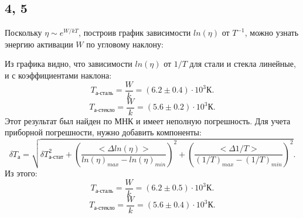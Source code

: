 \subsection*{4, 5}
Поскольку $\eta \sim e^{W/kT}$, построив график зависимости $ln(\eta)$ от $T^{-1}$, можно узнать энергию активации $W$ по угловому наклону:

Из графика видно, что зависимости $ln(\eta)$ от $1/T$ для стали и стекла линейные, и с коэффициентами наклона:
$$T_\text{а-сталь} = \frac{W}{k} = (6.2 \pm 0.4) \cdot 10^3 \text{К}.$$
$$T_\text{а-стекло} = \frac{W}{k} = (5.6 \pm 0.2) \cdot 10^3 \text{К}.$$
Этот результат был найден по МНК и имеет неполную погрешность. Для учета приборной погрешности, нужно добавить компоненты:
$$\delta T_\text{а} = \sqrt{\delta T_\text{а-стат}^2 + \left(\frac{<\Delta ln(\eta)>}{ln(\eta)_{max} - ln(\eta)_{min}}\right)^2 + \left(\frac{<\Delta 1/T>}{(1/T)_{max} - (1/T)_{min}}\right)^2}.$$
Из этого:
$$T_\text{а-сталь} = \frac{W}{k} = (6.2 \pm 0.5) \cdot 10^3 \text{К}.$$
$$T_\text{а-стекло} = \frac{W}{k} = (5.6 \pm 0.4) \cdot 10^3 \text{К}.$$

